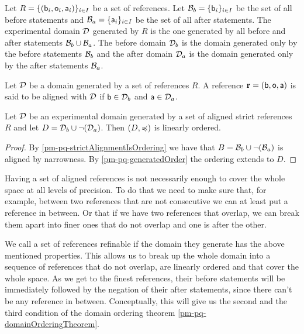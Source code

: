 \begin{mathSection}
	
	\begin{defn}
		Let $R = \{( \stmt[b]_i, \stmt[o]_i, \stmt[a]_i )\}_{i \in I}$ be a set of references. Let $\basis_b = \{\stmt[b]_i\}_{i \in I}$ be the set of all before statements and $\basis_a = \{\stmt[a]_i\}_{i \in I}$ be the set of all after statements. The experimental domain $\edomain$ generated by $R$ is the one generated by all before and after statements $\basis_b \cup \basis_a$. The before domain $\edomain_b$ is the domain generated only by the before statements $\basis_b$ and the after domain $\edomain_a$ is the domain generated only by the after statements $\basis_a$.
	\end{defn}
	
	\begin{defn}
		Let $\edomain$ be a domain generated by a set of references $R$. A reference $\refStmt = ( \stmt[b], \stmt[o], \stmt[a] )$ is said to be aligned with $\edomain$ if $\stmt[b] \in \edomain_b$ and $\stmt[a] \in \edomain_a$.
	\end{defn}
	
	\begin{prop}\label{pm-pq-basisGenerateOrdering}
		Let $\edomain$ be an experimental domain generated by a set of aligned strict references $R$ and let $D=\edomain_b \cup \NOT (\edomain_a)$. Then $(D, \narrower)$ is linearly ordered.
	\end{prop}
	\begin{proof}
		By \ref{pm-pq-strictAlignmentIsOrdering} we have that $B = \basis_b \cup \NOT(\basis_a)$ is aligned by narrowness. By \ref{pm-pq-generatedOrder} the ordering extends to $D$.
	\end{proof}
	
\end{mathSection}

Having a set of aligned references is not necessarily enough to cover the whole space at all levels of precision. To do that we need to make sure that, for example, between two references that are not consecutive we can at least put a reference in between. Or that if we have two references that overlap, we can break them apart into finer ones that do not overlap and one is after the other.

We call a set of references refinable if the domain they generate has the above mentioned properties. This allows us to break up the whole domain into a sequence of references that do not overlap, are linearly ordered and that cover the whole space. As we get to the finest references, their before statements will be immediately followed by the negation of their after statements, since there can't be any reference in between. Conceptually, this will give us the second and the third condition of the domain ordering theorem \ref{pm-pq-domainOrderingTheorem}.

